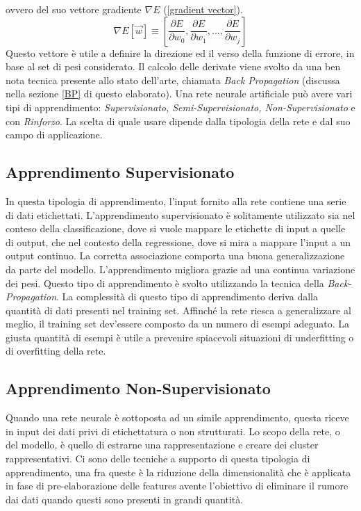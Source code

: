 ovvero del suo vettore gradiente $\nabla{E}$ (\ref{gradient vector}). 
\begin{equation}\label{gradient vector}
    \nabla{E}[\vec{w}]\equiv\left[\frac{\partial E}{\partial w_{0}}, \frac{\partial E}{\partial w_{1}}, \dots, \frac{\partial E}{\partial w_{j}}\right]
\end{equation}
Questo vettore è utile a definire la direzione ed il verso della funzione di errore, 
in base al set di pesi considerato. Il calcolo delle derivate viene svolto da una ben 
nota tecnica presente allo stato dell'arte, chiamata \emph{Back Propagation} (discussa 
nella sezione \ref{BP} di questo elaborato). Una rete neurale artificiale può avere vari 
tipi di apprendimento: \emph{Supervisionato, Semi-Supervisionato, Non-Supervisionato} 
e con \emph{Rinforzo}. La scelta di quale usare dipende dalla tipologia della rete e dal 
suo campo di applicazione.

\subsection{Apprendimento Supervisionato}
In questa tipologia di apprendimento, l’input fornito alla rete contiene una serie di 
dati etichettati. L’apprendimento supervisionato è solitamente utilizzato sia nel 
conteso della classificazione, dove  si vuole mappare le etichette di input a quelle 
di output, che nel contesto della regressione, dove si mira a mappare l’input a un 
output continuo. La corretta associazione comporta una buona generalizzazione 
da parte del modello. L’apprendimento migliora grazie ad una continua variazione 
dei pesi. Questo tipo di apprendimento è svolto utilizzando la tecnica della 
\emph{Back-Propagation}. La complessità di questo tipo di apprendimento deriva dalla 
quantità di dati presenti nel training set. Affinché la rete riesca a generalizzare al 
meglio, il training set dev’essere composto da un numero di esempi adeguato. La 
giusta quantità di esempi è utile a prevenire spiacevoli situazioni di underfitting o 
di overfitting della rete.

\subsection{Apprendimento Non-Supervisionato}
Quando una rete neurale è sottoposta ad un simile apprendimento, questa riceve 
in input dei dati privi di etichettatura o non strutturati. Lo scopo della rete, 
o del modello, è quello di estrarne una rappresentazione e creare dei cluster 
rappresentativi. Ci sono delle tecniche a supporto di questa tipologia di apprendimento, 
una fra queste è la riduzione della dimensionalità che è applicata in fase 
di pre-elaborazione delle features avente l’obiettivo di eliminare il rumore dai dati 
quando questi sono presenti in grandi quantità. 

